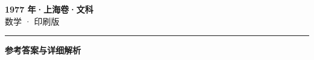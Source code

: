 \documentclass[zihao=5, a4paper]{ctexart}
\begin{document}
\begin{center}
  {\Large\bfseries 1977 年·上海卷·文科}\\[4pt]
  {\large 数学 · 印刷版}
\end{center}
\medskip
{}

\par\bigskip\hrule\bigskip
{}
\begin{center}{\large\bfseries 参考答案与详细解析}\end{center}
\smallskip

\end{document}
